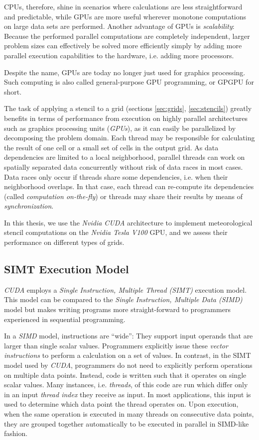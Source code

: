 CPUs, therefore, shine in scenarios where calculations are less straightforward and predictable, while GPUs are more useful wherever monotone computations on large data sets are performed. Another advantage of GPUs is \emph{scalability}: Because the performed parallel computations are completely independent, larger problem sizes can effectively be solved more efficiently simply by adding more parallel execution capabilities to the hardware, i.e. adding more processors. 

Despite the name, GPUs are today no longer just used for graphics processing. Such computing is also called general-purpose GPU programming, or GPGPU for short.

The task of applying a stencil to a grid (sections \ref{sec:grids}, \ref{sec:stencils}) greatly benefits in terms of performance from execution on highly parallel architectures such as graphics processing units (\emph{GPUs}), as it can easily be parallelized by decomposing the problem domain. Each thread may be responsible for calculating the result of one cell or a small set of cells in the output grid. As data dependencies are limited to a local neighborhood, parallel threads can work on spatially separated data concurrently without risk of data races in most cases. Data races only occur if threads share some dependencies, i.e. when their neighborhood overlaps. In that case, each thread can re-compute its dependencies (called \emph{computation on-the-fly}) or threads may share their results by means of \emph{synchronization}.

In this thesis, we use the \emph{Nvidia CUDA} architecture to implement meteorological stencil computations on the \emph{Nvidia Tesla V100} GPU, and we assess their performance on different types of grids.

\subsection{SIMT Execution Model}

\emph{CUDA} employs a \emph{Single Instruction, Multiple Thread (SIMT)} execution model. This model can be compared to the \emph{Single Instruction, Multiple Data (SIMD)} model but makes writing programs more straight-forward to programmers experienced in sequential programming. \cite[Section~3.1]{ptx-isa} 

In a \emph{SIMD} model, instructions are ``wide'': They support input operands that are larger than single scalar values. Programmers explicitly issue these \emph{vector instructions} to perform a calculation on a set of values. In contrast, in the SIMT model used by \emph{CUDA}, programmers do not need to explicitly perform operations on multiple data points. Instead, code is written such that it operates on single scalar values. Many instances, i.e. \emph{threads}, of this code are run which differ only in an input \emph{thread index} they receive as input. In most applications, this input is used to determine which data point the thread operates on. Upon execution, when the same operation is executed in many threads on consecutive data points, they are grouped together automatically to be executed in parallel in SIMD-like fashion.

